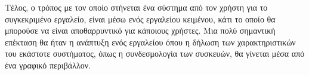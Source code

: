 Τέλος, ο τρόπος με τον οποίο στήνεται ένα σύστημα από τον χρήστη για το συγκεκριμένο εργαλείο, είναι μέσω ενός εργαλείου κειμένου, κάτι το οποίο θα μπορούσε να είναι αποθαρρυντικό για κάποιους χρήστες. Μια πολύ σημαντική επέκταση θα ήταν η ανάπτυξη ενός εργαλείου όπου η δήλωση των χαρακτηριστικών του εκάστοτε συστήματος, όπως η συνδεσμολογία των συσκευών, θα γίνεται μέσα από ένα γραφικό περιβάλλον.